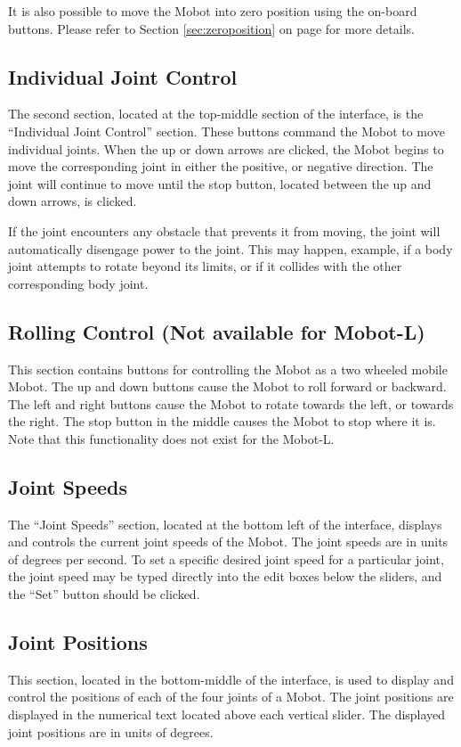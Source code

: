 \documentclass{article}
\begin{document}
It is also possible to move the Mobot into zero position using the
on-board buttons. Please refer to Section \ref{sec:zeroposition} on
page \pageref{sec:zeroposition} for more details.

\subsection{Individual Joint Control}
The second section, located at the top-middle section of the interface,
is the ``Individual Joint Control'' section. These buttons command the
Mobot to move individual joints. When the up or down arrows are clicked,
the Mobot begins to move the corresponding joint in either the positive,
or negative direction. The joint will continue to move until the stop 
button, located between the up and down arrows, is clicked. 

If the joint encounters any obstacle that prevents it from moving, the 
joint will automatically disengage power to the joint. This may happen, 
example, if a body joint attempts to rotate beyond its limits,
or if it collides with the other corresponding body joint. 

\subsection{Rolling Control (Not available for Mobot-L)}
This section contains buttons for controlling the Mobot as a 
two wheeled mobile Mobot. The up and down buttons cause the Mobot to
roll forward or backward. The left and right buttons cause the Mobot 
to rotate towards the left, or towards the right. The stop button in the
middle causes the Mobot to stop where it is. Note that this functionality
does not exist for the Mobot-L.

\subsection{Joint Speeds}
The ``Joint Speeds'' section, located at the bottom left of the interface,
displays and controls the current joint speeds of the Mobot.
The joint speeds are in units of degrees per second. To set a specific 
desired joint speed for a particular joint, the joint speed may be 
typed directly into the edit boxes below the sliders, and the ``Set''
button should be clicked.
 
\subsection{Joint Positions}
This section, located in the bottom-middle of the interface, is used to display
and control the positions of each of the four
joints of a Mobot. The joint positions are displayed in the numerical
text located above each vertical slider. The displayed joint positions are in
units of degrees.  
\end{document}
